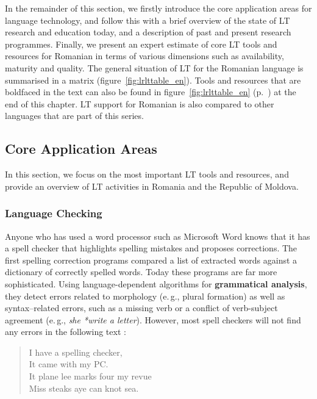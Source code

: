 \documentclass[]{../../metanetpaper}
\begin{document}
\begin{multicols}{2}
In the remainder of this section, we firstly introduce the core application areas for language technology, and follow this with a brief overview of the state of LT research and education today, and a description of past and present research programmes. Finally, we present an expert estimate of core LT tools and resources for Romanian in terms of various dimensions such as availability, maturity and quality. The general situation of LT for the Romanian language is summarised in a matrix (figure~\ref{fig:lrlttable_en}). Tools and resources that are boldfaced in the text can also be found in figure~\ref{fig:lrlttable_en} (p.~\pageref{fig:lrlttable_en}) at the end of this chapter. LT support for Romanian is also compared to other languages that are part of this series.

\subsection{Core Application Areas}

In this section, we focus on the most important LT tools and resources, and provide an overview of LT activities in Romania and the Republic of Moldova. 

\subsubsection{Language Checking}

Anyone who has used a word processor such as Microsoft Word knows that it has a spell checker that highlights spelling mistakes and proposes corrections. The first spelling correction programs compared a list of extracted words against a dictionary of correctly spelled words. Today these programs are far more sophisticated. Using language-dependent algorithms for \textbf{grammatical analysis}, they detect errors related to morphology (e.\,g., plural formation) as well as syntax–related errors, such as a missing verb or a conflict of verb-subject agreement (e.\,g., \textit{she *write a letter}). However, most spell checkers will not find any errors in the following text \cite{zar1}:

\begin{quote}
  I have a spelling checker,\\
  It came with my PC.\\
  It plane lee marks four my revue\\
  Miss steaks aye can knot sea.
\end{quote}


\end{multicols}
\end{document}
